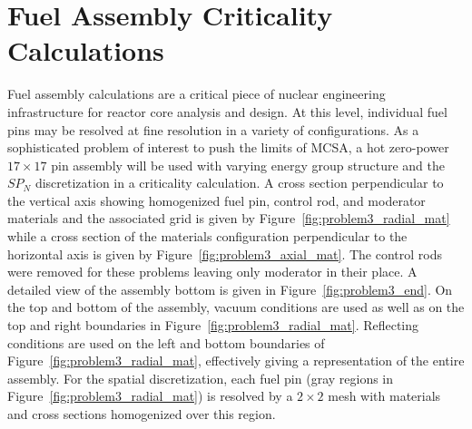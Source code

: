 \section{Fuel Assembly Criticality Calculations}
\label{sec:fuel_assembly_calcs}
Fuel assembly calculations are a critical piece of nuclear engineering
infrastructure for reactor core analysis and design. At this level,
individual fuel pins may be resolved at fine resolution in a variety
of configurations. As a sophisticated problem of interest to push the
limits of MCSA, a hot zero-power $17 \times 17$ pin assembly will be
used with varying energy group structure and the $SP_N$ discretization
in a criticality calculation. A cross section perpendicular to the
vertical axis showing homogenized fuel pin, control rod, and moderator
materials and the associated grid is given by
Figure~\ref{fig:problem3_radial_mat} while a cross section of the
materials configuration perpendicular to the horizontal axis is given
by Figure~\ref{fig:problem3_axial_mat}. The control rods were removed
for these problems leaving only moderator in their place. A detailed
view of the assembly bottom is given in
Figure~\ref{fig:problem3_end}. On the top and bottom of the assembly,
vacuum conditions are used as well as on the top and right boundaries
in Figure~\ref{fig:problem3_radial_mat}. Reflecting conditions are
used on the left and bottom boundaries of
Figure~\ref{fig:problem3_radial_mat}, effectively giving a
representation of the entire assembly. For the spatial discretization,
each fuel pin (gray regions in Figure~\ref{fig:problem3_radial_mat})
is resolved by a $2 \times 2$ mesh with materials and cross sections
homogenized over this region.
